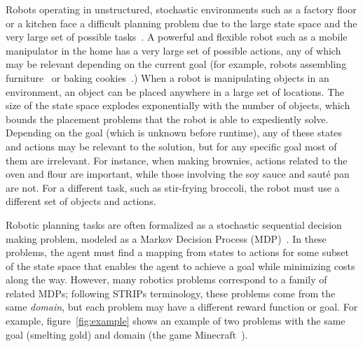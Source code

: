 \documentclass[letterpaper]{article}
\begin{document}
Robots operating in unstructured, stochastic environments such as a
factory floor or a kitchen face a difficult planning problem due to
the large state space and the very large set of possible
tasks~\citep{bollini12,knepper13}.  A powerful and flexible robot such
as a mobile manipulator in the home has a very large set of possible
actions, any of which may be relevant depending on the current goal
(for example, robots assembling furniture~\citep{knepper13} or baking
cookies~\citep{bollini12}.) When a robot is manipulating objects in
an environment, an object can be placed anywhere in a large set of
locations.  The size of the state space explodes exponentially with
the number of objects, which bounds the placement problems that the
robot is able to expediently solve.  Depending on the goal
(which is unknown before runtime), any of these states and actions may
be relevant to the solution, but for any specific goal
most of them are irrelevant.  For instance, when making brownies, actions related to the
oven and flour are important, while those involving the soy sauce and saut\'{e} pan
are not.  For a different task, such as stir-frying broccoli, the
robot must use a different set of objects and
actions. 

Robotic planning tasks are often formalized as a stochastic sequential
decision making problem, modeled as a Markov Decision Process
(MDP)~\citep{thrun2008probabilistic}. In these problems, the agent
must find a mapping from states to actions for some subset of the
state space that enables the agent to achieve a goal while minimizing
costs along the way.  However, many robotics problems correspond to a
family of related MDPs; following STRIPs terminology, these problems
come from the same {\it domain}, but each problem may have a different reward
function or goal.  For example, figure~\ref{fig:example}
shows an example of two problems with the same goal (smelting gold) and domain (the game
Minecraft~\citep{minecraft}).
\end{document}
